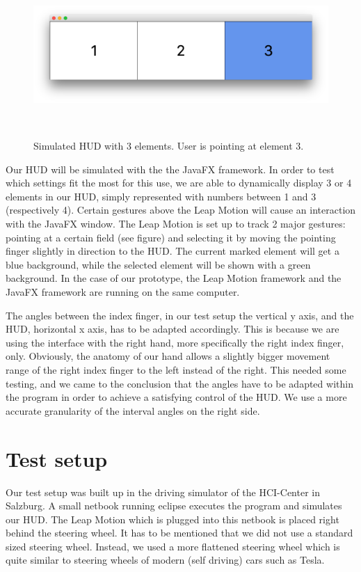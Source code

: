 \documentclass{sigchi-ext}
\begin{document}
\FloatBarrier

\begin{figure}
\centering
  \includegraphics[width=0.9\columnwidth]{figures/hudelements.jpg}
  \caption{Simulated HUD with 3 elements. User is pointing at element 3.}~\label{fig:figure1}
\end{figure}

Our HUD will be simulated with the the JavaFX framework. In order to test which settings fit the most for this use,
we are able to dynamically display 3 or 4 elements in our HUD, simply represented with numbers between 1 and 3 (respectively 4).
Certain gestures above the Leap Motion will cause an interaction with the JavaFX window.
The Leap Motion is set up to track 2 major gestures: pointing at a certain field (see figure)
and selecting it by moving the pointing finger slightly in direction to the HUD. The current marked element will get a blue background, while the selected element will be shown with a green background. In the case of our prototype,
the Leap Motion framework and the JavaFX framework are running on the same computer.

The angles between the index finger, in our test setup the vertical y axis, and the HUD, horizontal x axis,  has to be adapted accordingly. This is because we are using the
interface with the right hand, more specifically the right index finger, only. Obviously, the anatomy of our hand
allows a slightly bigger movement range of the right index finger to the left instead of the right. This needed some testing, and we came to
the conclusion that the angles have to be adapted within the program in order to achieve a satisfying control of the HUD. We use a more accurate granularity of the interval angles on the 
right side.

\section{Test setup}
Our test setup was built up in the driving simulator of the HCI-Center in Salzburg. A small netbook running eclipse executes the program and simulates our HUD. The Leap Motion which is plugged into this netbook is placed right behind the steering wheel. It has to be mentioned that we did not use a standard sized steering wheel. Instead, we used a more flattened steering wheel which is quite similar to steering wheels of modern (self driving) cars such as Tesla.
\end{document}
